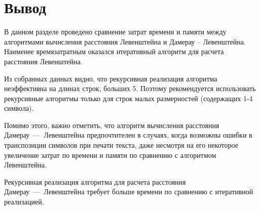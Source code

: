 \section{Вывод}

В данном разделе проведено сравнение затрат времени и памяти между алгоритмами вычисления расстояния Левенштейна и Дамерау -- Левенштейна. 
Наименее времязатратным оказался итеративный алгоритм для расчета расстояния Левенштейна.

Из собранных данных видно, что рекурсивная реализация алгоритма неэффективна на длинах строк, больших 5. 
Поэтому рекомендуется использовать рекурсивные алгоритмы только для строк малых размерностей (содержащих 1-4 символа).

Помимо этого, важно отметить, что алгоритм вычисления расстояния Дамерау~---~Левенштейна предпочтителен в случаях, когда возможны ошибки в транспозиции символов при печати текста, даже несмотря на его некоторое увеличение затрат по времени и памяти по сравнению с алгоритмом Левенштейна.

Рекурсивная реализация алгоритма для расчета расстояния Дамерау~---~Левенштейна требует больше времени по сравнению с итеративной реализацией.